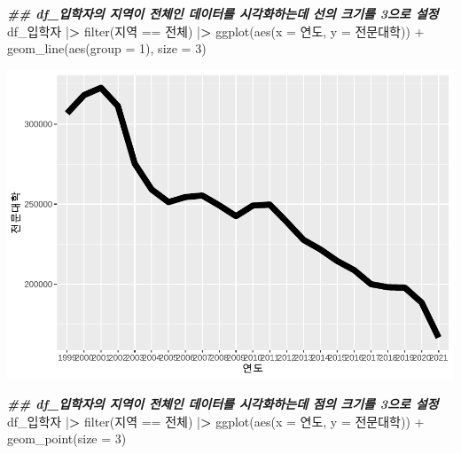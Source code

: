 \documentclass[
]{article}
\newenvironment{Shaded}{\begin{snugshade}}{\end{snugshade}}
\newcommand{\AttributeTok}[1]{\textcolor[rgb]{0.77,0.63,0.00}{#1}}
\newcommand{\DecValTok}[1]{\textcolor[rgb]{0.00,0.00,0.81}{#1}}
\newcommand{\DocumentationTok}[1]{\textcolor[rgb]{0.56,0.35,0.01}{\textbf{\textit{#1}}}}
\newcommand{\ErrorTok}[1]{\textcolor[rgb]{0.64,0.00,0.00}{\textbf{#1}}}
\newcommand{\FunctionTok}[1]{\textcolor[rgb]{0.00,0.00,0.00}{#1}}
\newcommand{\NormalTok}[1]{#1}
\newcommand{\SpecialCharTok}[1]{\textcolor[rgb]{0.00,0.00,0.00}{#1}}
\newcommand{\StringTok}[1]{\textcolor[rgb]{0.31,0.60,0.02}{#1}}
\begin{document}
\begin{Shaded}
\begin{Highlighting}[]
\DocumentationTok{\#\# df\_입학자의 지역이 \textquotesingle{}전체\textquotesingle{}인 데이터를 시각화하는데 선의 크기를 3으로 설정}
\NormalTok{df\_입학자 }\SpecialCharTok{|}\ErrorTok{\textgreater{}} \FunctionTok{filter}\NormalTok{(지역 }\SpecialCharTok{==} \StringTok{\textquotesingle{}전체\textquotesingle{}}\NormalTok{) }\SpecialCharTok{|}\ErrorTok{\textgreater{}}
  \FunctionTok{ggplot}\NormalTok{(}\FunctionTok{aes}\NormalTok{(}\AttributeTok{x =}\NormalTok{ 연도, }\AttributeTok{y =}\NormalTok{ 전문대학)) }\SpecialCharTok{+}
  \FunctionTok{geom\_line}\NormalTok{(}\FunctionTok{aes}\NormalTok{(}\AttributeTok{group =} \DecValTok{1}\NormalTok{), }\AttributeTok{size =} \DecValTok{3}\NormalTok{)}
\end{Highlighting}
\end{Shaded}

\includegraphics{chap3_files/figure-latex/unnamed-chunk-13-1.pdf}

\begin{Shaded}
\begin{Highlighting}[]
\DocumentationTok{\#\# df\_입학자의 지역이 \textquotesingle{}전체\textquotesingle{}인 데이터를 시각화하는데 점의 크기를 3으로 설정}
\NormalTok{df\_입학자 }\SpecialCharTok{|}\ErrorTok{\textgreater{}} \FunctionTok{filter}\NormalTok{(지역 }\SpecialCharTok{==} \StringTok{\textquotesingle{}전체\textquotesingle{}}\NormalTok{) }\SpecialCharTok{|}\ErrorTok{\textgreater{}}
  \FunctionTok{ggplot}\NormalTok{(}\FunctionTok{aes}\NormalTok{(}\AttributeTok{x =}\NormalTok{ 연도, }\AttributeTok{y =}\NormalTok{ 전문대학)) }\SpecialCharTok{+}
  \FunctionTok{geom\_point}\NormalTok{(}\AttributeTok{size =} \DecValTok{3}\NormalTok{)}
\end{Highlighting}
\end{Shaded}
\end{document}
